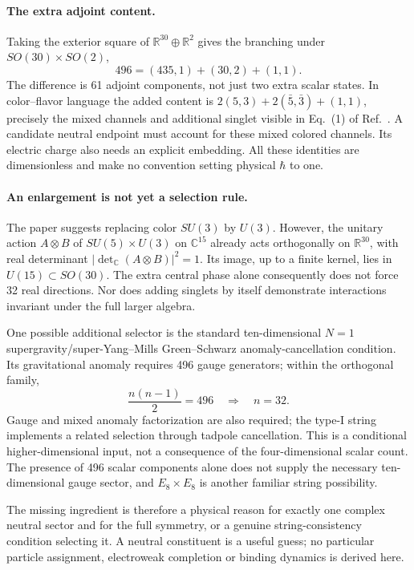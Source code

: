 \paragraph{The extra adjoint content.}
Taking the exterior square of $\mathbb R^{30}\oplus\mathbb R^2$
gives the branching under $SO(30)\times SO(2)$,
\begin{equation}
496=(435,1)+(30,2)+(1,1).
\end{equation}
The difference is 61 adjoint components, not just two extra scalar
states. In color--flavor language the added content is
$2(5,3)+2(\bar5,\bar3)+(1,1)$, precisely the mixed channels and
additional singlet visible in Eq.~(1) of Ref.~\cite{Rivero2024}.
A candidate neutral endpoint must account for these mixed colored
channels. Its electric charge also needs an explicit embedding.
All these identities are dimensionless and make no convention
setting physical $\hbar$ to one.

\paragraph{An enlargement is not yet a selection rule.}
The paper suggests replacing color $SU(3)$ by $U(3)$.
However, the unitary action $A\otimes B$ of
$SU(5)\times U(3)$ on $\mathbb C^{15}$ already acts orthogonally
on $\mathbb R^{30}$, with real determinant
$|\det_{\mathbb C}(A\otimes B)|^2=1$.
Its image, up to a finite kernel, lies in $U(15)\subset SO(30)$.
The extra central phase alone consequently does not force 32
real directions. Nor does adding singlets by itself demonstrate
interactions invariant under the full larger algebra.

One possible additional selector is the standard ten-dimensional
$N=1$ supergravity/super-Yang--Mills Green--Schwarz anomaly-cancellation
condition. Its gravitational anomaly requires 496 gauge generators;
within the orthogonal family,
\begin{equation}
\frac{n(n-1)}{2}=496\quad\Longrightarrow\quad n=32.
\end{equation}
Gauge and mixed anomaly factorization are also required; the type-I
string implements a related selection through tadpole cancellation.
This is a conditional higher-dimensional input, not a consequence of
the four-dimensional scalar count. The presence of 496 scalar
components alone does not supply the necessary ten-dimensional
gauge sector, and $E_8\times E_8$ is another familiar string possibility.

The missing ingredient is therefore a physical reason for exactly
one complex neutral sector and for the full symmetry, or a genuine
string-consistency condition selecting it. A neutral constituent is
a useful guess; no particular particle assignment, electroweak
completion or binding dynamics is derived here.
